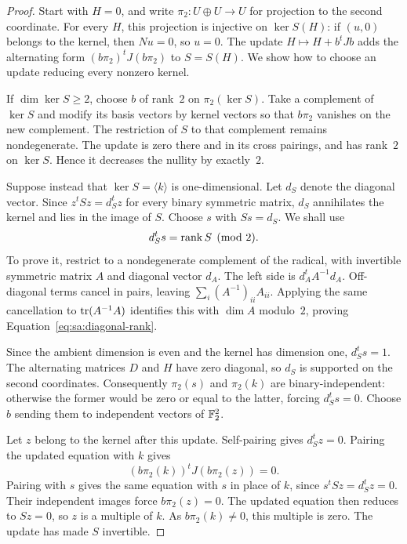 \begin{proof}
Start with $H=0$, and write $\pi_2:U\oplus U\to U$ for projection
to the second coordinate.  For every $H$, this projection is injective
on $\ker S(H)$: if $(u,0)$ belongs to the kernel, then $Nu=0$,
so $u=0$.  The update $H\mapsto H+b^tJb$ adds the alternating
form $(b\pi_2)^tJ(b\pi_2)$ to $S=S(H)$.  We show how to choose
an update reducing every nonzero kernel.

If $\dim\ker S\ge2$, choose $b$ of rank~$2$ on
$\pi_2(\ker S)$.  Take a complement of $\ker S$ and modify its
basis vectors by kernel vectors so that $b\pi_2$ vanishes on the
new complement.  The restriction of $S$ to that complement remains
nondegenerate.  The update is zero there and in its cross pairings,
and has rank~$2$ on $\ker S$.  Hence it decreases the nullity by
exactly~$2$.

Suppose instead that $\ker S=\langle k\rangle$ is one-dimensional.
Let $d_S$ denote the diagonal vector.  Since $z^tSz=d_S^tz$ for
every binary symmetric matrix, $d_S$ annihilates the kernel and lies
in the image of $S$.  Choose $s$ with $Ss=d_S$.  We shall use
\begin{equation}
 d_S^ts=\operatorname{rank} S\pmod2.
 \label{eq:sa:diagonal-rank}
\end{equation}
To prove it, restrict to a nondegenerate complement of the radical,
with invertible symmetric matrix $A$ and diagonal vector $d_A$.
The left side is $d_A^tA^{-1}d_A$.  Off-diagonal terms cancel in
pairs, leaving $\sum_i(A^{-1})_{ii}A_{ii}$.  Applying the same
cancellation to $\operatorname{tr}(A^{-1}A)$ identifies this with $\dim A$
modulo~$2$, proving Equation~\eqref{eq:sa:diagonal-rank}.

Since the ambient dimension is even and the kernel has dimension one,
$d_S^ts=1$.  The alternating matrices $D$ and $H$ have zero
diagonal, so $d_S$ is supported on the second coordinates.
Consequently $\pi_2(s)$ and $\pi_2(k)$ are binary-independent:
otherwise the former would be zero or equal to the latter, forcing
$d_S^ts=0$.  Choose $b$ sending them to independent vectors of
$\mathbb F_2^2$.

Let $z$ belong to the kernel after this update.  Self-pairing gives
$d_S^tz=0$.  Pairing the updated equation with $k$ gives
\[
 (b\pi_2(k))^tJ(b\pi_2(z))=0.
\]
Pairing with $s$ gives the same equation with $s$ in place of $k$,
since $s^tSz=d_S^tz=0$.  Their independent images force
$b\pi_2(z)=0$.  The updated equation then reduces to $Sz=0$, so
$z$ is a multiple of $k$.  As $b\pi_2(k)\ne0$, this multiple is
zero.  The update has made $S$ invertible.


\end{proof}
